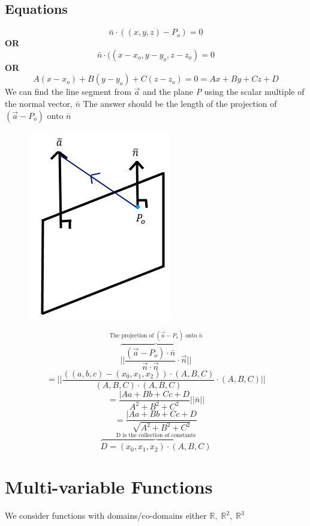 \documentclass{article}
\begin{document}
\subsection*{Equations}
\[\bar{n}\cdot((x,y,z)-P_o)=0\]
\textbf{OR}
\[\bar{n}\cdot((x-x_o,y-y_o,z-z_o)=0\]
\textbf{OR}
\[A(x-x_o)+B(y-y_o)+C(z-z_o)=0=Ax+By+Cz+D\]
\newline
We can find the line segment from $\vec{a}$ and the plane \textit{P} using the scalar multiple of the normal vector, $\bar{n}$
\newpage
The answer should be the length of the projection of $(\vec{a}-P_o)$ onto $\bar{n}$
\begin{figure}[h!]
    \centering
    \includegraphics[scale=.6]{projectionExample.png}
    \label{}
\end{figure}
\[\overbrace{||{\frac{(\vec{a}-P_o)\cdot\bar{n}}{\vec{n}\cdot\vec{n}}\cdot\vec{n}}||}^{\mbox{The projection of $(\vec{a}-P_o)$ onto $\bar{n}$}}\]
\[=||\frac{((a,b,c)-(x_0,x_1,x_2))\cdot(A,B,C)}{(A,B,C)\cdot(A,B,C)}\cdot(A,B,C)||\]
\[=\frac{|Aa+Bb+Cc+D}{A^2+B^2+C^2}||\bar{n}||\]
\[=\frac{|Aa+Bb+Cc+D}{\sqrt{A^2+B^2+C^2}}\]
\newline
\[\overbrace{D=(x_0,x_1,x_2)\cdot(A,B,C)}^{\mbox{D is the collection of constants}}\]

\section{Multi-variable Functions}
We consider functions with domains/co-domains either $\mathbb{R},\; \mathbb{R}^2,\; \mathbb{R}^3$
\end{document}
